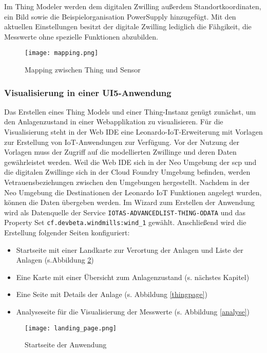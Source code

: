 \noindent Im Thing Modeler werden dem digitalen Zwilling außerdem Standortkoordinaten, ein Bild sowie die Beispielorganisation PowerSupply hinzugefügt. Mit den aktuellen Einstellungen besitzt der digitale Zwilling lediglich die Fähgikeit, die Messwerte ohne spezielle Funktionen abzubilden.

\begin{figure} [H]
  \centering
  \texttt{[image: mapping.png]}
  \caption{Mapping zwischen Thing und Sensor}
  \label{mapping}
\end{figure}

\subsubsection{Visualisierung in einer UI5-Anwendung}

Das Erstellen eines Thing Models und einer Thing-Instanz genügt zunächst, um den Anlagenzustand in einer Webapplikation zu visualisieren. Für die Visualisierung steht in der Web IDE eine Leonardo-IoT-Erweiterung mit Vorlagen zur Erstellung von IoT-Anwendungen zur Verfügung. Vor der Nutzung der Vorlagen muss der Zugriff auf  die modellierten Zwillinge und deren Daten gewährleistet werden. Weil die Web IDE sich in der Neo Umgebung der \ac{scp} und die digitalen Zwillinge sich in der Cloud Foundry Umgebung befinden, werden Vetrauensbeziehungen zwischen den Umgebungen hergestellt. Nachdem in der Neo Umgebung die Destinationen der Leonardo IoT Funktionen angelegt wurden, können die Daten übergeben werden. Im Wizard zum Erstellen der Anwendung wird als Datenquelle der Service \texttt{IOTAS-ADVANCEDLIST-THING-ODATA} und das Property Set \texttt{cf.devbeta.\-windmills:wind\_1} gewählt. Anschließend wird die Erstellung folgender Seiten konfiguriert:

\begin{itemize}
  \item Startseite mit einer Landkarte zur Verortung der Anlagen und Liste der Anlagen (s.Abbildung \ref{landing})
  \item Eine Karte mit einer Übersicht zum Anlagenzustand (s. nächstes Kapitel)
  \item Eine Seite mit Details der Anlage (s. Abbildung \ref{thingpage})
  \item Analyseseite für die Visualisierung der Messwerte (s. Abbildung \ref{analyse})
\end{itemize}

\begin{figure}[H]
  \centering
  \texttt{[image: landing\_page.png]}
  \caption{Startseite der Anwendung}
  \label{landing}
\end{figure}

